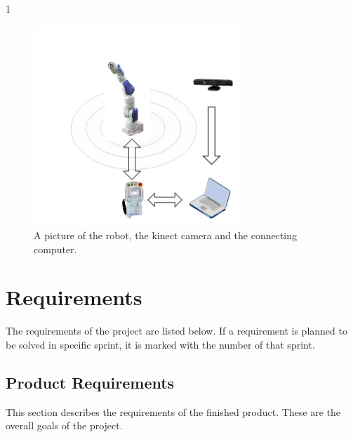 1\documentclass[10pt,a4paper]{article}
\begin{document}
\begin{figure}[H] 
  \centering
    \includegraphics[width = 0.7\textwidth]{robot.jpg}
    \caption{A picture of the robot, the kinect camera and the connecting computer.}
    \label{fig:safetyzone}
\end{figure}


\section{Requirements}
The requirements of the project are listed below. If a requirement is planned to be solved in specific sprint, it is marked with the number of that sprint. 
{\addtolength{\leftskip}{10mm}
\subsection{Product Requirements}
This section describes the requirements of the finished product. These are the overall goals of the project. \par}
\end{document}

